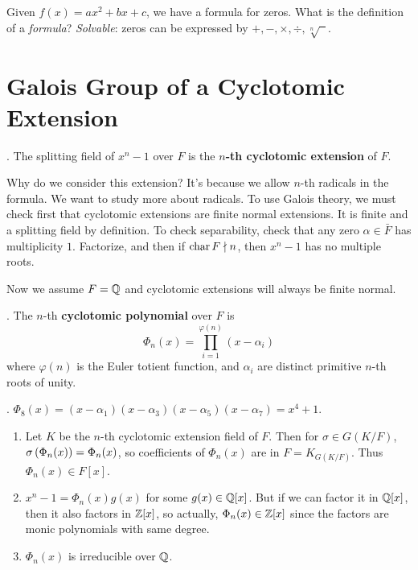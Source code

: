 \pagebreak


Given \(f(x) = ax^2 + bx + c\), we have a formula for zeros. What is the definition of a \textit{formula}? \textit{Solvable}: zeros can be expressed by \(+, -, \times, \div, \sqrt[n]{\phantom{a}}\).

\section*{Galois Group of a Cyclotomic Extension}

.  The splitting field of \(x^n-1\) over \(F\) is the \(n\)\textbf{-th cyclotomic extension} of \(F\).

Why do we consider this extension? It's because we allow \(n\)-th radicals in the formula. We want to study more about radicals. To use Galois theory, we must check first that cyclotomic extensions are finite normal extensions. It is finite and a splitting field by definition. To check separability, check that any zero \(\alpha \in \bar{F}\) has multiplicity \(1\). Factorize, and then if \(\operatorname{char} F \nmid n\), then \(x^n - 1\) has no multiple roots.

Now we assume \(F = \mathbb{Q}\) and cyclotomic extensions will always be finite normal.

.  The \(n\)-th \textbf{cyclotomic polynomial} over \(F\) is
\[
    \Phi_n(x) = \prod_{i=1}^{\varphi(n)} (x - \alpha_i)
\]
where \(\varphi(n)\) is the Euler totient function, and \(\alpha_i\) are distinct primitive \(n\)-th roots of unity.

\ex. \(\Phi_8(x) = (x - \alpha_1)(x - \alpha_3)(x - \alpha_5)(x - \alpha_7) = x^4 + 1\).

\rmk
\begin{enumerate}
    \item Let \(K\) be the \(n\)-th cyclotomic extension field of \(F\). Then for \(\sigma \in G(K/F)\), \(\sigma\left( \Phi_n(x) \right) = \Phi_n(x)\), so coefficients of \(\Phi_n(x)\) are in \(F = K_{G(K/F)}\). Thus \(\Phi_n(x) \in F[x]\).

    \item \(x^n - 1 = \Phi_n(x) g(x)\) for some \(g(x) \in \mathbb{Q}[x]\). But if we can factor it in \(\mathbb{Q}[x]\), then it also factors in \(\mathbb{Z}[x]\), so actually, \(\Phi_n(x) \in \mathbb{Z}[x]\) since the factors are monic polynomials with same degree.

    \item \(\Phi_n(x)\) is irreducible over \(\mathbb{Q}\).
\end{enumerate}

